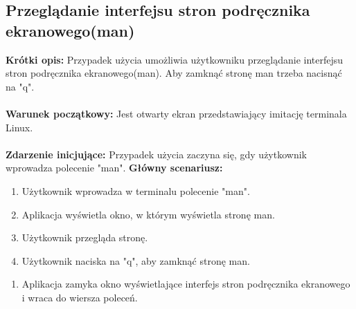\documentclass[10pt,a4paper]{report}
\begin{document}
\begin{adjustwidth}{2cm}{2cm}
\subsection{Przeglądanie interfejsu stron podręcznika ekranowego(man)}
\begin{minipage}{1\linewidth}
\textbf{Krótki opis:} Przypadek użycia umożliwia użytkowniku przeglądanie interfejsu stron podręcznika ekranowego(man). Aby zamknąć stronę man trzeba nacisnąć na "q". \\ \\
\textbf{Warunek początkowy:} Jest otwarty ekran przedstawiający imitację terminala Linux.\\ \\
\textbf{Zdarzenie inicjujące:} Przypadek użycia zaczyna się, gdy użytkownik wprowadza polecenie "man".
\textbf{Główny scenariusz:} 
\begin{enumerate}
\setlength\itemsep{0.2cm}
    \item Użytkownik wprowadza w terminalu polecenie "man".
    \item Aplikacja wyświetla okno, w którym wyświetla stronę man.
    \item Użytkownik przegląda stronę.
    \item Użytkownik naciska na "q", aby zamknąć stronę man. 
    \end{enumerate}
    \end{minipage}
   \begin{minipage}{1\linewidth}
   \begin{enumerate}
    \item Aplikacja zamyka okno wyświetlające interfejs stron podręcznika ekranowego i wraca do wiersza poleceń.
\end{enumerate}
\end{minipage}

\end{adjustwidth}
\end{document}
